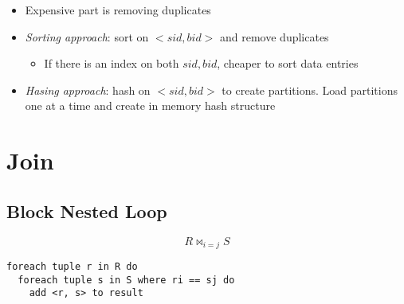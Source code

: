   \begin{itemize}
    \item Expensive part is removing duplicates
    \item \emph{Sorting approach}: sort on $ <sid, bid> $ and remove duplicates
    \begin{itemize}
      \item If there is an index on both $ sid, bid $, cheaper to sort data
      entries
    \end{itemize}
    \item \emph{Hasing approach}: hash on $ <sid, bid> $ to create partitions.
    Load partitions one at a time and create in memory hash structure
  \end{itemize}

\section{Join}

  \subsection{Block Nested Loop}

    \begin{equation*}
      R \Join_{i = j} S
    \end{equation*}

    \begin{lstlisting}
foreach tuple r in R do
  foreach tuple s in S where ri == sj do
    add <r, s> to result
    \end{lstlisting}

